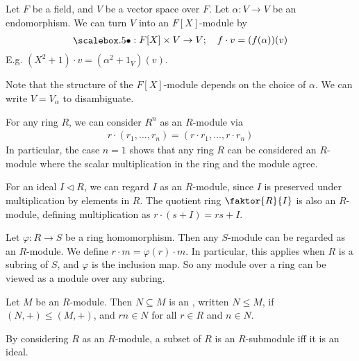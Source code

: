 \begin{example}
	Let $F$ be a field, and $V$ be a vector space over $F$.
	Let $\alpha : V \to V$ be an endomorphism.
	We can turn $V$ into an $F[X]$-module by
	\begin{align*}
		\bigcdot : F[X] \times V \to V;\quad f \cdot v = (f(\alpha))(v)
	\end{align*}
	E.g. $(X^2 + 1) \cdot v = (\alpha^2 + 1_V)(v)$.

	Note that the structure of the $F[X]$-module depends on the choice of $\alpha$.
	We can write $V = V_\alpha$ to disambiguate.
\end{example} 

\begin{example}
	For any ring $R$, we can consider $R^n$ as an $R$-module via
	\begin{align*}
		r \cdot (r_1, \dots, r_n) = (r \cdot r_1, \dots, r \cdot r_n)
	\end{align*}
	In particular, the case $n = 1$ shows that any ring $R$ can be considered an $R$-module where the scalar multiplication in the ring and the module agree.
\end{example} 

\begin{example}
	For an ideal $I \triangleleft R$, we can regard $I$ as an $R$-module, since $I$ is preserved under multiplication by elements in $R$.
	The quotient ring $\faktor{R}{I}$ is also an $R$-module, defining multiplication as $r \cdot (s+I) = rs + I$.
\end{example} 

\begin{example}
	Let $\varphi : R \to S$ be a ring homomorphism.
	Then any $S$-module can be regarded as an $R$-module.
	We define $r \cdot m = \varphi(r) \cdot m$.
	In particular, this applies when $R$ is a subring of $S$, and $\varphi$ is the inclusion map.
	So any module over a ring can be viewed as a module over any subring.
\end{example} 

\begin{definition}[Submodule]
	Let $M$ be an $R$-module.
	Then $N \subseteq M$ is an , written $N \leq M$, if $(N, +) \leq (M, +)$, and $rn \in N$ for all $r \in R$ and $n \in N$.
\end{definition}

\begin{example}
	By considering $R$ as an $R$-module, a subset of $R$ is an $R$-submodule iff it is an ideal.
\end{example}


